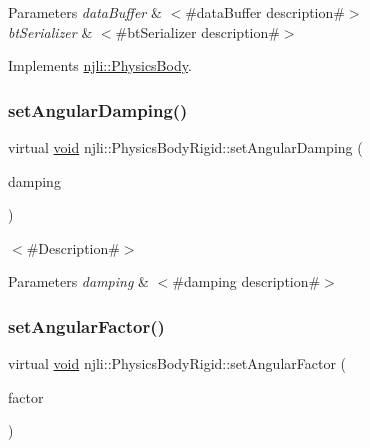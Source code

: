 \begin{DoxyParams}{Parameters}
{\em data\+Buffer} & $<$\#data\+Buffer description\#$>$ \\
\hline
{\em bt\+Serializer} & $<$\#bt\+Serializer description\#$>$ \\
\hline
\end{DoxyParams}


Implements \mbox{\hyperlink{classnjli_1_1_physics_body_a3c40378e7f3033557ec6adf9428b6a9d}{njli\+::\+Physics\+Body}}.

\mbox{\label{classnjli_1_1_physics_body_rigid_a9cf475f63ddb4962e95dc47d2f0bc8c5}} 
\subsubsection{\texorpdfstring{set\+Angular\+Damping()}{setAngularDamping()}}
{\footnotesize\ttfamily virtual \mbox{\hyperlink{_thread_8h_af1e856da2e658414cb2456cb6f7ebc66}{void}} njli\+::\+Physics\+Body\+Rigid\+::set\+Angular\+Damping (\begin{DoxyParamCaption}\item[{\mbox{\hyperlink{_util_8h_a5f6906312a689f27d70e9d086649d3fd}{f32}}}]{damping }\end{DoxyParamCaption})\hspace{0.3cm}{\ttfamily [virtual]}}

$<$\#\+Description\#$>$


\begin{DoxyParams}{Parameters}
{\em damping} & $<$\#damping description\#$>$ \\
\hline
\end{DoxyParams}
\mbox{\label{classnjli_1_1_physics_body_rigid_aea1f079a7abc6817bb53ed59e816e4e9}} 
\subsubsection{\texorpdfstring{set\+Angular\+Factor()}{setAngularFactor()}\hspace{0.1cm}{\footnotesize\ttfamily [1/2]}}
{\footnotesize\ttfamily virtual \mbox{\hyperlink{_thread_8h_af1e856da2e658414cb2456cb6f7ebc66}{void}} njli\+::\+Physics\+Body\+Rigid\+::set\+Angular\+Factor (\begin{DoxyParamCaption}\item[{const bt\+Vector3 \&}]{factor }\end{DoxyParamCaption})\hspace{0.3cm}{\ttfamily [virtual]}}

